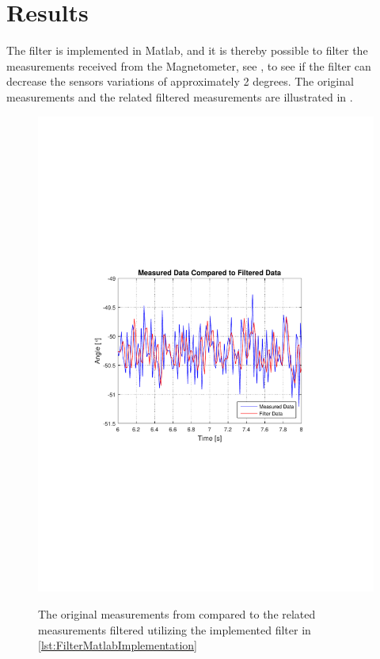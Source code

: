 \section{Results}
The filter is implemented in Matlab, and it is thereby possible to filter the measurements received from the Magnetometer, see , to see if the filter can decrease the sensors variations of approximately 2 degrees. The original measurements and the related filtered measurements are illustrated in .
%
\begin{figure}[H]
  \centering
  {
    \includegraphics[width=1.2\textwidth]{figures/FinalImplementedFilter.pdf}
  }
  \caption{The original measurements from  compared to the related measurements filtered utilizing the implemented filter in \autoref{lst:FilterMatlabImplementation}}
  \label{fig:FinalImplementedFilter}
\end{figure}\vspace{-5mm}

